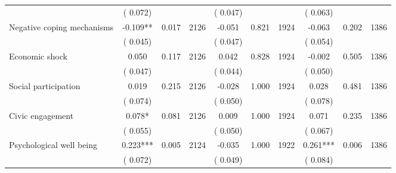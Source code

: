 \begin{tabular}{l*{9}{c}}
                               &        (       0.072) & &                                                                &       (       0.047) & &                                                         &       (       0.063) & & \\ 
 Negative coping mechanisms                &             -0.109**        &        0.017 & 2126        &             -0.051 &        0.821 & 1924               &       -0.063 &        0.202 & 1386       \\ 
                               &        (       0.045) & &                                                                &       (       0.047) & &                                                         &       (       0.054) & & \\ 
 Economic shock                &              0.050        &        0.117 & 2126        &              0.042 &        0.828 & 1924               &       -0.002 &        0.505 & 1386       \\ 
                               &        (       0.047) & &                                                                &       (       0.044) & &                                                         &       (       0.050) & & \\ 
 Social participation                &              0.019        &        0.215 & 2126        &             -0.028 &        1.000 & 1924               &        0.028 &        0.481 & 1386      \\ 
                               &        (       0.074) & &                                                                &       (       0.050) & &                                                         &       (       0.078) & & \\ 
 Civic engagement                &              0.078*        &        0.081 & 2126        &              0.009 &        1.000 & 1924               &        0.071 &        0.235 & 1386       \\ 
                               &        (       0.055) & &                                                                &       (       0.050) & &                                                         &       (       0.067) & & \\ 
 Psychological well being                &              0.223***        &        0.005 & 2124        &             -0.035 &        1.000 & 1922               &        0.261*** &        0.006 & 1386       \\ 
                               &        (       0.072) & &                                                                &       (       0.049) & &                                                         &       (       0.084) & & \\ 

\end{tabular}
